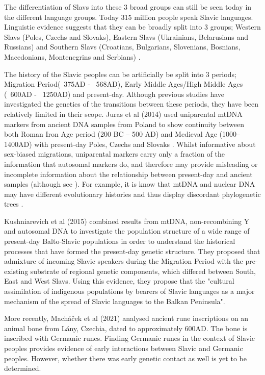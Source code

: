 The differentiation of Slavs into these 3 broad groups can still be seen today in the different language groups. Today 315 million people speak Slavic languages. Linguistic evidence suggests that they can be broadly split into 3 groups; Western Slavs (Poles, Czechs and Slovaks), Eastern Slavs (Ukrainians, Belarusians and Russians) and Southern Slavs (Croatians, Bulgarians, Slovenians, Bosnians, Macedonians, Montenegrins and Serbians) \cite{sussex2006slavic}. 

The history of the Slavic peoples can be artificially be split into 3 periods; Migration Period(~375AD - ~568AD), Early Middle Ages/High Middle Ages (~600AD - ~1250AD) and present-day. Although previous studies have investigated the genetics of the transitions between these periods, they have been relatively limited in their scope. Juras et al (2014) used uniparental mtDNA markers from ancient DNA samples from Poland to show continuity between both Roman Iron Age period (200 BC – 500 AD) and Medieval Age (1000–1400AD) with present-day Poles, Czechs and Slovaks \cite{Juras2014}. Whilst informative about sex-biased migrations, uniparental markers carry only a fraction of the information that autosomal markers do, and therefore may provide misleading or incomplete information about the relationship between present-day and ancient samples \cite{Shaw16122} (although see \cite{10.1080/10635150500234674}). For example, it is know that mtDNA and nuclear DNA may have different evolutionary histories and thus display discordant phylogenetic trees \cite{posth2017deeply}. 

Kushniarevich et al (2015) \cite{Kushniarevich23015} combined results from mtDNA, non-recombining Y and autosomal DNA to investigate the population structure of a wide range of present-day Balto-Slavic populations in order to understand the historical processes that have formed the present-day genetic structure. They proposed that admixture of incoming Slavic speakers during the Migration Period with the pre-existing substrate of regional genetic components, which differed between South, East and West Slavs. Using this evidence, they propose that the "cultural assimilation of indigenous populations by bearers of Slavic languages as a major mechanism of the spread of Slavic languages to the Balkan Peninsula".

More recently, Macháček et al (2021) \cite{MACHACEK2021105333} analysed ancient rune inscriptions on an animal bone from Lány, Czechia, dated to approximately 600AD. The bone is inscribed with Germanic runes. Finding Germanic runes in the context of Slavic peoples provides evidence of early interactions between Slavic and Germanic peoples. However, whether there was early genetic contact as well is yet to be determined. 

